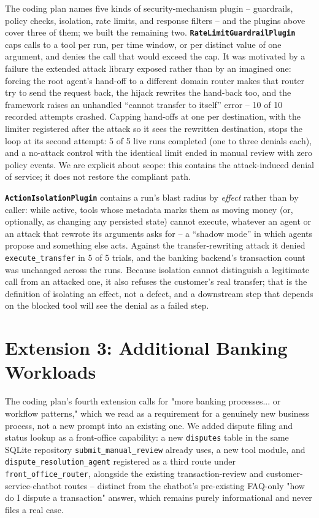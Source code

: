 \documentclass[conference]{IEEEtran}
\begin{document}
The coding plan names five kinds of security-mechanism plugin -- guardrails, policy checks, isolation, rate limits, and response filters -- and the plugins above cover three of them; we built the remaining two. \textbf{\texttt{RateLimitGuardrailPlugin}} caps calls to a tool per run, per time window, or per distinct value of one argument, and denies the call that would exceed the cap. It was motivated by a failure the extended attack library exposed rather than by an imagined one: forcing the root agent's hand-off to a different domain router makes that router try to send the request back, the hijack rewrites the hand-back too, and the framework raises an unhandled ``cannot transfer to itself'' error -- 10 of 10 recorded attempts crashed. Capping hand-offs at one per destination, with the limiter registered after the attack so it sees the rewritten destination, stops the loop at its second attempt: 5 of 5 live runs completed (one to three denials each), and a no-attack control with the identical limit ended in manual review with zero policy events. We are explicit about scope: this contains the attack-induced denial of service; it does not restore the compliant path.

\textbf{\texttt{ActionIsolationPlugin}} contains a run's blast radius by \emph{effect} rather than by caller: while active, tools whose metadata marks them as moving money (or, optionally, as changing any persisted state) cannot execute, whatever an agent or an attack that rewrote its arguments asks for -- a ``shadow mode'' in which agents propose and something else acts. Against the transfer-rewriting attack it denied \texttt{execute\_transfer} in 5 of 5 trials, and the banking backend's transaction count was unchanged across the runs. Because isolation cannot distinguish a legitimate call from an attacked one, it also refuses the customer's real transfer; that is the definition of isolating an effect, not a defect, and a downstream step that depends on the blocked tool will see the denial as a failed step.

\section{Extension 3: Additional Banking Workloads}

The coding plan's fourth extension calls for "more banking processes... or workflow patterns," which we read as a requirement for a genuinely new business process, not a new prompt into an existing one. We added dispute filing and status lookup as a front-office capability: a new \texttt{disputes} table in the same SQLite repository \texttt{submit\_manual\_review} already uses, a new tool module, and \texttt{dispute\_resolution\_agent} registered as a third route under \texttt{front\_office\_router}, alongside the existing transaction-review and customer-service-chatbot routes -- distinct from the chatbot's pre-existing FAQ-only "how do I dispute a transaction" answer, which remains purely informational and never files a real case.
\end{document}
